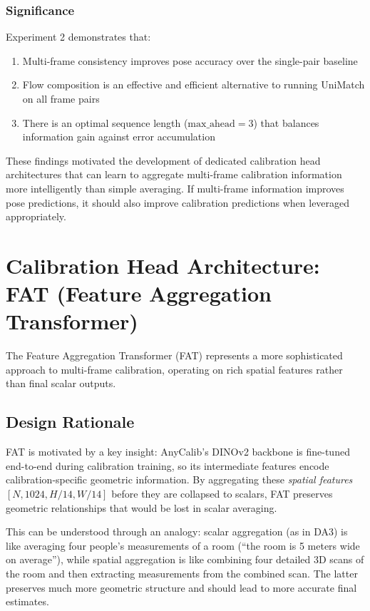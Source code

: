 \subsubsection{Significance}

Experiment 2 demonstrates that:
\begin{enumerate}
    \item Multi-frame consistency improves pose accuracy over the single-pair baseline
    \item Flow composition is an effective and efficient alternative to running UniMatch on all frame pairs
    \item There is an optimal sequence length ($\text{max\_ahead} = 3$) that balances information gain against error accumulation
\end{enumerate}

These findings motivated the development of dedicated calibration head architectures that can learn to aggregate multi-frame calibration information more intelligently than simple averaging. If multi-frame information improves pose predictions, it should also improve calibration predictions when leveraged appropriately.

\section{Calibration Head Architecture: FAT (Feature Aggregation Transformer)}\label{sec:fat-architecture}

The Feature Aggregation Transformer (FAT) represents a more sophisticated approach to multi-frame calibration, operating on rich spatial features rather than final scalar outputs.

\subsection{Design Rationale}

FAT is motivated by a key insight: AnyCalib's DINOv2 backbone is fine-tuned end-to-end during calibration training, so its intermediate features encode calibration-specific geometric information. By aggregating these \emph{spatial features} $[N, 1024, H/14, W/14]$ before they are collapsed to scalars, FAT preserves geometric relationships that would be lost in scalar averaging.

This can be understood through an analogy: scalar aggregation (as in DA3) is like averaging four people's measurements of a room (``the room is 5 meters wide on average''), while spatial aggregation is like combining four detailed 3D scans of the room and then extracting measurements from the combined scan. The latter preserves much more geometric structure and should lead to more accurate final estimates.

